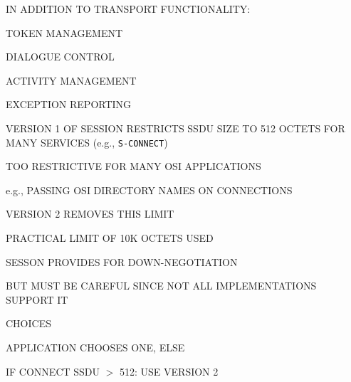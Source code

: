 \begin{bwslide}

\begin{nrtc}
\item	IN ADDITION TO TRANSPORT FUNCTIONALITY:
    \begin{nrtc}
    \item	TOKEN MANAGEMENT

    \item	DIALOGUE CONTROL

    \item	ACTIVITY MANAGEMENT

    \item	EXCEPTION REPORTING
    \end{nrtc}
\end{nrtc}
\end{bwslide}



\begin{bwslide}

\begin{nrtc}
\item	VERSION 1 OF SESSION RESTRICTS SSDU SIZE TO 512 OCTETS FOR MANY
	SERVICES (e.g., \verb"S-CONNECT")

\item	TOO RESTRICTIVE FOR MANY OSI APPLICATIONS
    \begin{nrtc}
    \item	e.g., PASSING OSI DIRECTORY NAMES ON CONNECTIONS
    \end{nrtc}

\item	VERSION 2 REMOVES THIS LIMIT
    \begin{nrtc}
    \item	PRACTICAL LIMIT OF 10K OCTETS USED
    \end{nrtc}

\item	SESSON PROVIDES FOR DOWN-NEGOTIATION
	\begin{nrtc}
	\item	BUT MUST BE CAREFUL SINCE NOT ALL IMPLEMENTATIONS SUPPORT IT

	\item	CHOICES
	    \begin{nrtc}
	    \item	APPLICATION CHOOSES ONE, ELSE

	    \item	IF CONNECT SSDU $>$ 512: USE VERSION 2
	    \end{nrtc}
	\end{nrtc}
\end{nrtc}
\end{bwslide}


